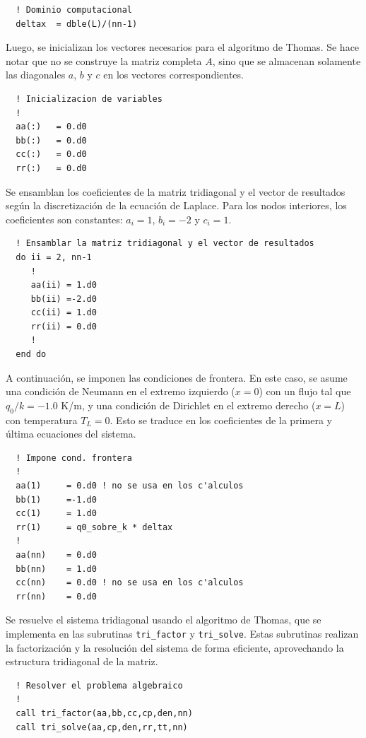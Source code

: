 \documentclass[11pt,a4paper]{article}
\begin{document}
\begin{verbatim}
  ! Dominio computacional
  deltax  = dble(L)/(nn-1)
\end{verbatim}

Luego, se inicializan los vectores necesarios para el algoritmo de Thomas.
Se hace notar que no se construye la matriz completa $A$, sino que se almacenan 
solamente las diagonales $a$, $b$ y $c$ en los vectores correspondientes.

\begin{verbatim}
  ! Inicializacion de variables
  !
  aa(:)   = 0.d0
  bb(:)   = 0.d0
  cc(:)   = 0.d0
  rr(:)   = 0.d0
\end{verbatim}

Se ensamblan los coeficientes de la matriz tridiagonal y el vector de resultados
seg\'un la discretizaci\'on de la ecuaci\'on de Laplace. Para los nodos 
interiores, los coeficientes son constantes: $a_i=1$, $b_i=-2$ y $c_i=1$.

\begin{verbatim}
  ! Ensamblar la matriz tridiagonal y el vector de resultados
  do ii = 2, nn-1
     !
     aa(ii) = 1.d0
     bb(ii) =-2.d0
     cc(ii) = 1.d0
     rr(ii) = 0.d0
     !
  end do
\end{verbatim}

A continuaci\'on, se imponen las condiciones de frontera. En este caso, 
se asume una condici\'on de Neumann en el extremo izquierdo ($x=0$) con un 
flujo tal que  $q_0 / k = -1\textrm{.}0$ K/m, y una condici\'on de 
Dirichlet en el extremo derecho ($x=L$) 
con temperatura $T_L=0$. Esto se traduce en los coeficientes de la primera y 
\'ultima ecuaciones del sistema.

\begin{verbatim}
  ! Impone cond. frontera
  !
  aa(1)     = 0.d0 ! no se usa en los c'alculos
  bb(1)     =-1.d0
  cc(1)     = 1.d0
  rr(1)     = q0_sobre_k * deltax
  !  
  aa(nn)    = 0.d0
  bb(nn)    = 1.d0
  cc(nn)    = 0.d0 ! no se usa en los c'alculos
  rr(nn)    = 0.d0 
\end{verbatim}

Se resuelve el sistema tridiagonal usando el algoritmo de Thomas, que se 
implementa en las subrutinas \verb|tri_factor| y \verb|tri_solve|. Estas
subrutinas realizan la factorizaci\'on y la resoluci\'on del sistema de 
forma eficiente, aprovechando la estructura tridiagonal de la matriz.

\begin{verbatim}
  ! Resolver el problema algebraico
  !
  call tri_factor(aa,bb,cc,cp,den,nn)
  call tri_solve(aa,cp,den,rr,tt,nn)
\end{verbatim}
\end{document}

